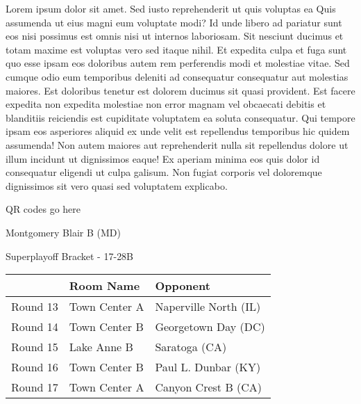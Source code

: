 \documentclass{article}%
\begin{document}
\vspace*{8pt}%
\linebreak%
\newline%
\newline%
Lorem ipsum dolor sit amet. Sed iusto reprehenderit ut quis voluptas ea Quis assumenda ut eius magni eum voluptate modi? Id unde libero ad pariatur sunt eos nisi possimus est omnis nisi ut internos laboriosam. Sit nesciunt ducimus et totam maxime est voluptas vero sed itaque nihil. Et expedita culpa et fuga sunt quo esse ipsam eos doloribus autem rem perferendis modi et molestiae vitae.\newline%
\newline%
Sed cumque odio eum temporibus deleniti ad consequatur consequatur aut molestias maiores. Est doloribus tenetur est dolorem ducimus sit quasi provident. Est facere expedita non expedita molestiae non error magnam vel obcaecati debitis et blanditiis reiciendis est cupiditate voluptatem ea soluta consequatur. Qui tempore ipsam eos asperiores aliquid ex unde velit est repellendus temporibus hic quidem assumenda!\newline%
\newline%
Non autem maiores aut reprehenderit nulla sit repellendus dolore ut illum incidunt ut dignissimos eaque! Ex aperiam minima eos quis dolor id consequatur eligendi ut culpa galisum. Non fugiat corporis vel doloremque dignissimos sit vero quasi sed voluptatem explicabo.\newline%
\newline%
%
\vspace*{30pt}%
\begin{center}%
\begin{Huge}%
QR codes go here%
\end{Huge}%
\end{center}%
\newpage%
\begin{center}%
\begin{Huge}%
Montgomery Blair B (MD)%
\end{Huge}%
\vspace*{8pt}%
\linebreak%
\begin{Large}%
Superplayoff Bracket {-} 17{-}28B%
\end{Large}%
\end{center}%
%
\begin{tabularx}{\textwidth}{|c|Y|Y|}%
\hline%
&Room Name&Opponent\\%
\hline%
Round 13&Town Center A&Naperville North (IL)\\%
Round 14&Town Center B&Georgetown Day (DC)\\%
Round 15&Lake Anne B&Saratoga (CA)\\%
Round 16&Town Center B&Paul L. Dunbar (KY)\\%
Round 17&Town Center A&Canyon Crest B (CA)\\%
\hline%
\end{tabularx}%
\end{document}
